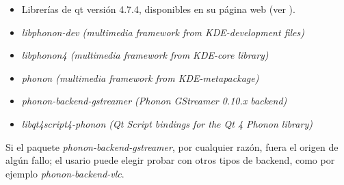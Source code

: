 		\begin{itemize}
			\item Librerías de qt versión 4.7.4, disponibles en su página web (ver \cite{qtlibs}).		
			\item \emph{libphonon-dev (multimedia framework from KDE-development files)} 
			\item \emph{libphonon4 (multimedia framework from KDE-core library)}
			\item \emph{phonon (multimedia framework from KDE-metapackage)}
			\item \emph{phonon-backend-gstreamer (Phonon GStreamer 0.10.x backend)}
			\item \emph{libqt4script4-phonon (Qt Script bindings for the Qt 4 Phonon library)}
			
		\end{itemize}
	
		Si el paquete \emph{phonon-backend-gstreamer}, por cualquier razón, fuera el origen de algún fallo; el usario puede elegir probar con otros tipos de backend, como por ejemplo \emph{phonon-backend-vlc}.
		
		
